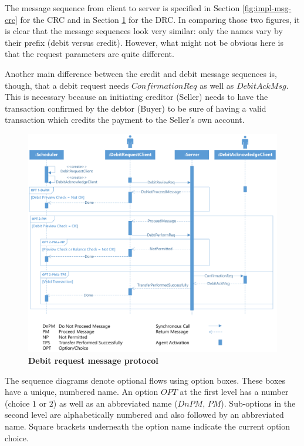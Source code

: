 The message sequence from client to server is specified in Section \ref{fig:impl-msg-crc} for the CRC and in Section \ref{fig:impl-msg-drc} for the DRC. In comparing those two figures, it is clear that the message sequences look very similar: only the names vary by their prefix (debit versus credit). However, what might not be obvious here is that the request parameters are quite different.

Another main difference between the credit and debit message sequences is, though, that a debit request needs $ConfirmationReq$ as well as $DebitAckMsg$. This is necessary because an initiating creditor (Seller) needs to have the transaction confirmed by the debtor (Buyer) to be sure of having a valid transaction which credits the payment to the Seller's own account.

\begin{figure}[htbp]
  \centering
  \includegraphics[width=1.0\textwidth]{Figures/debitrequest}
  \caption{\bf\small Debit request message protocol}
  \label{fig:impl-msg-drc}
\end{figure}

The sequence diagrams denote optional flows using option boxes. These boxes have a unique, numbered name. An option $OPT$ at the first level has a number (choice $1$ or $2$) as well as an abbreviated name ($DnPM$, $PM$). Sub-options in the second level are alphabetically numbered and also followed by an abbreviated name. Square brackets underneath the option name indicate the current option choice.

